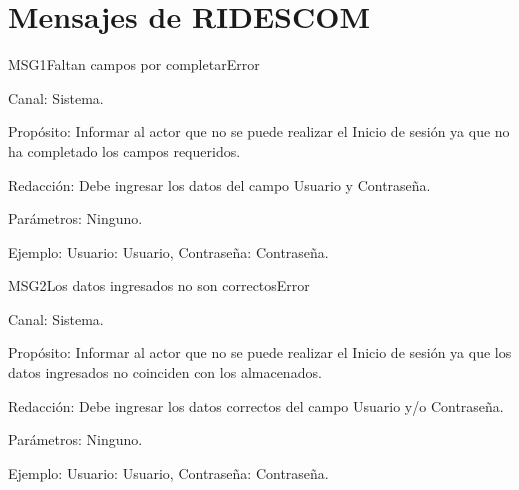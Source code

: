 \section{Mensajes de RIDESCOM}


\begin{mensaje}{MSG1}{Faltan campos por completar}{Error}

	\item[Canal:] Sistema.

    \item[Propósito:] Informar al actor que no se puede realizar el Inicio de sesión ya que no ha completado los campos requeridos.

    \item[Redacción:] Debe ingresar los datos del campo Usuario y Contraseña.

    \item[Parámetros:] Ninguno.

    \item[Ejemplo:] Usuario: Usuario, Contraseña: Contraseña.


\end{mensaje}
\newline




\begin{mensaje}{MSG2}{Los datos ingresados no son correctos}{Error}
	
	\item[Canal:] Sistema.
	
	\item[Propósito:] Informar al actor que no se puede realizar el Inicio de sesión ya que los datos ingresados no coinciden con los almacenados.
	
	\item[Redacción:] Debe ingresar los datos correctos del campo Usuario y/o Contraseña.
	
	\item[Parámetros:] Ninguno.
	
	\item[Ejemplo:] Usuario: Usuario, Contraseña: Contraseña.
	
	
\end{mensaje}